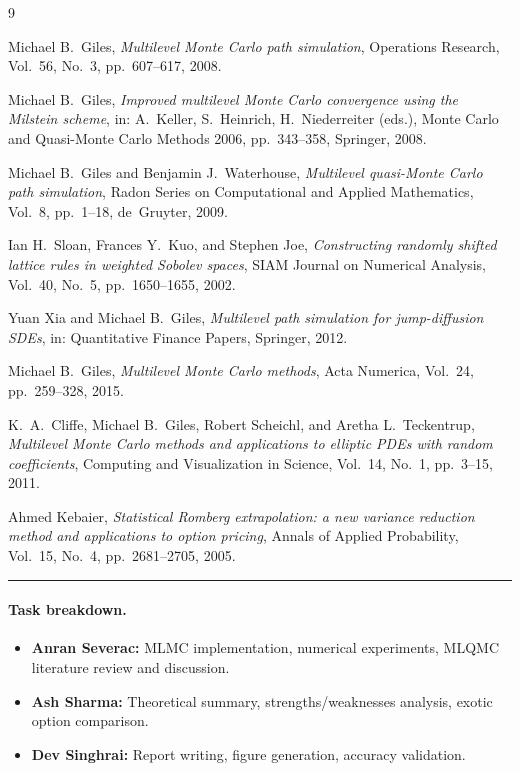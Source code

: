 \documentclass[11pt]{article}
\begin{document}
\begin{thebibliography}{9}

Michael B.\ Giles,
\textit{Multilevel Monte Carlo path simulation},
Operations Research, Vol.~56, No.~3, pp.~607--617, 2008.

Michael B.\ Giles,
\textit{Improved multilevel Monte Carlo convergence using the Milstein scheme},
in: A.~Keller, S.~Heinrich, H.~Niederreiter (eds.), Monte Carlo and Quasi-Monte Carlo Methods 2006, pp.~343--358, Springer, 2008.

Michael B.\ Giles and Benjamin J.\ Waterhouse,
\textit{Multilevel quasi-Monte Carlo path simulation},
Radon Series on Computational and Applied Mathematics, Vol.~8, pp.~1--18, de~Gruyter, 2009.

Ian H.\ Sloan, Frances Y.\ Kuo, and Stephen Joe,
\textit{Constructing randomly shifted lattice rules in weighted Sobolev spaces},
SIAM Journal on Numerical Analysis, Vol.~40, No.~5, pp.~1650--1655, 2002.

Yuan Xia and Michael B.\ Giles,
\textit{Multilevel path simulation for jump-diffusion SDEs},
in: Quantitative Finance Papers, Springer, 2012.

Michael B.\ Giles,
\textit{Multilevel Monte Carlo methods},
Acta Numerica, Vol.~24, pp.~259--328, 2015.

K.~A.\ Cliffe, Michael B.\ Giles, Robert Scheichl, and Aretha L.\ Teckentrup,
\textit{Multilevel Monte Carlo methods and applications to elliptic PDEs with random coefficients},
Computing and Visualization in Science, Vol.~14, No.~1, pp.~3--15, 2011.

Ahmed Kebaier,
\textit{Statistical Romberg extrapolation: a new variance reduction method and applications to option pricing},
Annals of Applied Probability, Vol.~15, No.~4, pp.~2681--2705, 2005.

\end{thebibliography}

\vspace{1.5em}
\noindent\rule{\textwidth}{0.4pt}
\paragraph{Task breakdown.}
\begin{itemize}
\item \textbf{Anran Severac:} MLMC implementation, numerical experiments, MLQMC literature review and discussion.
\item \textbf{Ash Sharma:} Theoretical summary, strengths/weaknesses analysis, exotic option comparison.
\item \textbf{Dev Singhrai:} Report writing, figure generation, accuracy validation.
\end{itemize}
\end{document}

